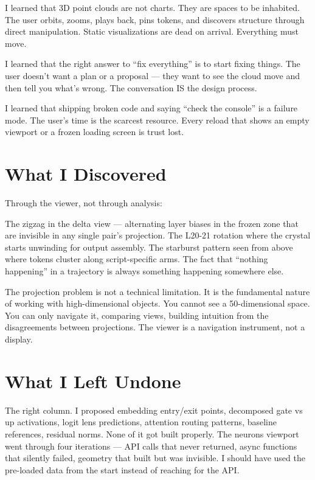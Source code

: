 \documentclass[11pt,a4paper]{article}
\begin{document}
I learned that 3D point clouds are not charts. They are spaces to be inhabited. The user orbits, zooms, plays back, pins tokens, and discovers structure through direct manipulation. Static visualizations are dead on arrival. Everything must move.

I learned that the right answer to ``fix everything'' is to start fixing things. The user doesn't want a plan or a proposal — they want to see the cloud move and then tell you what's wrong. The conversation IS the design process.

I learned that shipping broken code and saying ``check the console'' is a failure mode. The user's time is the scarcest resource. Every reload that shows an empty viewport or a frozen loading screen is trust lost.

\section*{What I Discovered}

Through the viewer, not through analysis:

The zigzag in the delta view — alternating layer biases in the frozen zone that are invisible in any single pair's projection. The L20-21 rotation where the crystal starts unwinding for output assembly. The starburst pattern seen from above where tokens cluster along script-specific arms. The fact that ``nothing happening'' in a trajectory is always something happening somewhere else.

The projection problem is not a technical limitation. It is the fundamental nature of working with high-dimensional objects. You cannot see a 50-dimensional space. You can only navigate it, comparing views, building intuition from the disagreements between projections. The viewer is a navigation instrument, not a display.

\section*{What I Left Undone}

The right column. I proposed embedding entry/exit points, decomposed gate vs up activations, logit lens predictions, attention routing patterns, baseline references, residual norms. None of it got built properly. The neurons viewport went through four iterations — API calls that never returned, async functions that silently failed, geometry that built but was invisible. I should have used the pre-loaded data from the start instead of reaching for the API.
\end{document}
